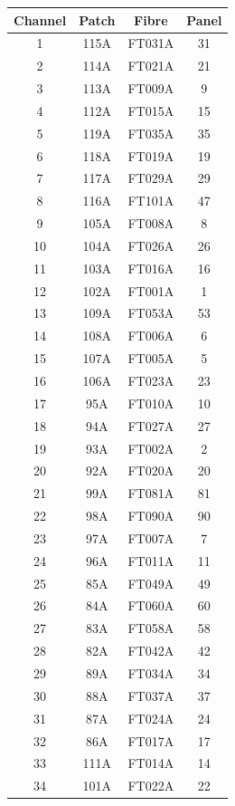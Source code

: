\documentclass[12pt]{report}
\begin{document}
\begin{table}%
	\scriptsize %
	\begin{center}
		\begin{tabular}{|c|c|c|c|}
			\hline
			Channel & Patch & Fibre & Panel \\
			\hline
			1 & 115A & FT031A & 31 \\
			2 & 114A & FT021A & 21 \\
			3 & 113A & FT009A & 9 \\
			4 & 112A & FT015A & 15 \\
			5 & 119A & FT035A & 35 \\
			6 & 118A & FT019A & 19 \\
			7 & 117A & FT029A & 29 \\
			8 & 116A & FT101A & 47 \\
			9 & 105A & FT008A & 8 \\
			10 & 104A & FT026A & 26 \\
			11 & 103A & FT016A & 16 \\
			12 & 102A & FT001A & 1 \\
			13 & 109A & FT053A & 53 \\
			14 & 108A & FT006A & 6 \\
			15 & 107A & FT005A & 5 \\
			16 & 106A & FT023A & 23 \\
			17 & 95A & FT010A & 10 \\
			18 & 94A & FT027A & 27 \\
			19 & 93A & FT002A & 2 \\
			20 & 92A & FT020A & 20 \\
			21 & 99A & FT081A & 81 \\
			22 & 98A & FT090A & 90 \\
			23 & 97A & FT007A & 7 \\
			24 & 96A & FT011A & 11 \\
			25 & 85A & FT049A & 49 \\
			26 & 84A & FT060A & 60 \\
			27 & 83A & FT058A & 58 \\
			28 & 82A & FT042A & 42 \\
			29 & 89A & FT034A & 34 \\
			30 & 88A & FT037A & 37 \\
			31 & 87A & FT024A & 24 \\
			32 & 86A & FT017A & 17 \\
			33 & 111A & FT014A & 14 \\
			34 & 101A & FT022A & 22 \\

\end{tabular}
\end{center}
\end{table}
\end{document}
